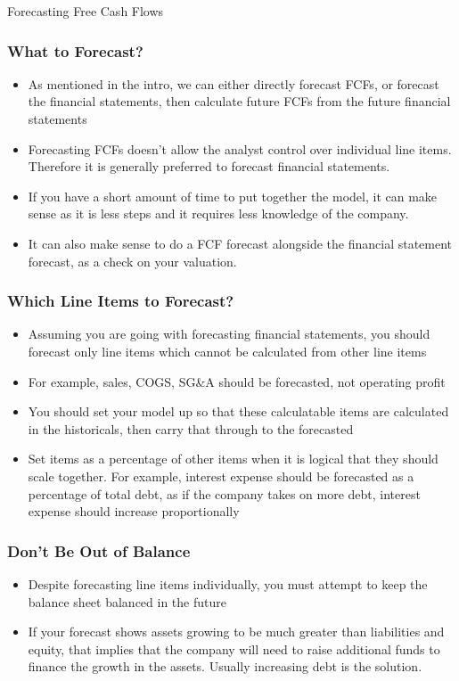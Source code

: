 \documentclass[handout, 11pt]{beamer}
\begin{document}
\begin{section}{Forecasting Free Cash Flows}
\begin{frame}
\frametitle{What to Forecast?}
\begin{itemize}
\item As mentioned in the intro, we can either directly forecast FCFs, or forecast the financial statements, then calculate future FCFs from the future financial statements
\vfill
\item Forecasting FCFs doesn't allow the analyst control over individual line items. Therefore it is generally preferred to forecast financial statements.
\vfill
\item If you have a short amount of time to put together the model, it can make sense as it is less steps and it requires less knowledge of the company.
\vfill
\item It can also make sense to do a FCF forecast alongside the financial statement forecast, as a check on your valuation.
\end{itemize}
\end{frame}
\begin{frame}
\frametitle{Which Line Items to Forecast?}
\begin{itemize}
\item Assuming you are going with forecasting financial statements, you should forecast only line items which cannot be calculated from other line items
\vfill
\item For example, sales, COGS, SG\&A should be forecasted, not operating profit
\vfill
\item You should set your model up so that these calculatable items are calculated in the historicals, then carry that through to the forecasted
\vfill
\item Set items as a percentage of other items when it is logical that they should scale together. For example, interest expense should be forecasted as a percentage of total debt, as if the company takes on more debt, interest expense should increase proportionally
\end{itemize}
\end{frame}
\begin{frame}
\frametitle{Don't Be Out of Balance}
\begin{itemize}
\item Despite forecasting line items individually, you must attempt to keep the balance sheet balanced in the future
\vfill
\item If your forecast shows assets growing to be much greater than liabilities and equity, that implies that the company will need to raise additional funds to finance the growth in the assets. Usually increasing debt is the solution.

\end{itemize}
\end{frame}
\end{section}
\end{document}
